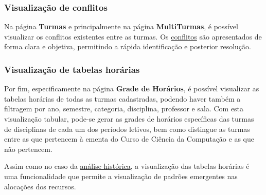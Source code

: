\subsubsection{Visualização de conflitos} \label{sssec:Visualização de conflitos}

Na página \textbf{Turmas} e principalmente na página \textbf{MultiTurmas}, é possível visualizar os conflitos existentes entre as turmas. Os \hyperref[sec:conflitos]{conflitos} são apresentados de forma clara e objetiva, permitindo a rápida identificação e posterior resolução.

\subsubsection{Visualização de tabelas horárias} \label{sssec:Visualização de tabelas horárias}

Por fim, especificamente na página \textbf{Grade de Horários}, é possível visualizar as tabelas horárias de todas as turmas cadastradas, podendo haver também a filtragem por ano, semestre, categoria, disciplina, professor e sala. Com esta visualização tabular, pode-se gerar as grades de horários específicas das turmas de disciplinas de cada um dos períodos letivos, bem como distingue as turmas entre as que pertencem à ementa do Curso de Ciência da Computação e as que não pertencem.

Assim como no caso da \hyperref[sssec:Análise histórica]{análise histórica}, a visualização das tabelas horárias é uma funcionalidade que permite a visualização de padrões emergentes nas alocações dos recursos.